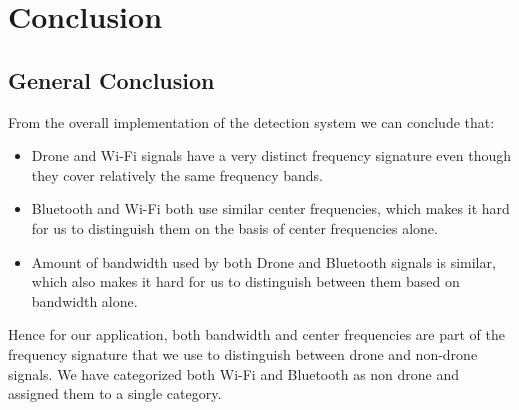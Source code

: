 \chapter{Conclusion} \label{Conclusion}
\section{General Conclusion} \label{General Conclusion}

From the overall implementation of the detection system we can conclude that:
\begin{itemize}
  \item Drone and Wi-Fi signals have a very distinct frequency signature even though they cover relatively the same frequency bands.

  \item Bluetooth and Wi-Fi both use similar center frequencies, which makes it hard for us to distinguish them on the basis of center frequencies alone.
  \item Amount of bandwidth used by both Drone and Bluetooth signals is similar, which also makes it hard for us to distinguish between them based on bandwidth alone.
\end{itemize}


Hence for our application, both bandwidth and center frequencies are part of the frequency  signature that we use to distinguish between drone and non-drone signals.
We have categorized both Wi-Fi and Bluetooth as non drone and assigned them to a single category.

